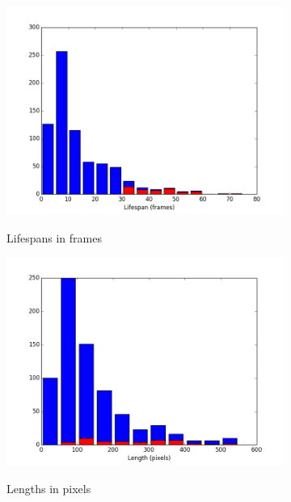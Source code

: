 \documentclass[notitlepage]{article}
\begin{document}
\begin{figure}[h!]
\centering
\begin{subfigure}{.3\textwidth}
  \centering
  \includegraphics[width=\textwidth]{lifespan}
  \label{fig:lifespan}
  \caption{Lifespans in frames}
\end{subfigure}
\begin{subfigure}{.3\textwidth}
  \centering
  \includegraphics[width=\textwidth]{length}
  \label{fig:length}
  \caption{Lengths in pixels}
\end{subfigure}
\begin{subfigure}{.3\textwidth}
  \centering

\end{subfigure}
\end{figure}
\end{document}
